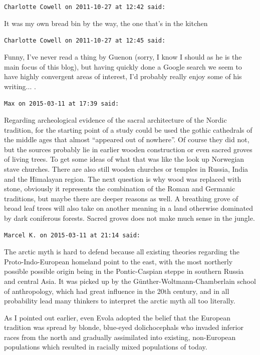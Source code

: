 \begin{footnotesize}
\begin{sffamily}
\hfill

\texttt{Charlotte Cowell on 2011-10-27 at 12:42 said:}

It was my own bread bin by the way, the one that's in the kitchen

\hfill

\texttt{Charlotte Cowell on 2011-10-27 at 12:45 said:}

Funny, I've never read a thing by Guenon (sorry, I know I should as he is the main focus of this blog), but having quickly done a Google search we seem to have highly convergent areas of interest, I'd probably really enjoy some of his writing... .

\hfill

\texttt{Max on 2015-03-11 at 17:39 said:}

Regarding archeological evidence of the sacral architecture of the Nordic tradition, for the starting point of a study could be used the gothic cathedrals of the middle ages that almost ``appeared out of nowhere''. Of course they did not, but the sources probably lie in earlier wooden construction or even sacred groves of living trees. To get some ideas of what that was like the look up Norwegian stave churches. There are also still wooden churches or temples in Russia, India and the Himalayan region. The next question is why wood was replaced with stone, obviously it represents the combination of the Roman and Germanic traditions, but maybe there are deeper reasons as well. A breathing grove of broad leaf trees will also take on another meaning in a land otherwise dominated by dark coniferous forests. Sacred groves does not make much sense in the jungle.

\hfill

\texttt{Marcel K. on 2015-03-11 at 21:14 said:}

The arctic myth is hard to defend because all existing theories regarding the Proto-Indo-European homeland point to the east, with the most northerly possible possible origin being in the Pontic-Caspian steppe in southern Russia and central Asia. It was picked up by the Günther-Woltmann-Chamberlain school of anthropology, which had great influence in the 20th century, and in all probability lead many thinkers to interpret the arctic myth all too literally.

As I pointed out earlier, even Evola adopted the belief that the European tradition was spread by blonde, blue-eyed dolichocephals who invaded inferior races from the north and gradually assimilated into existing, non-European populations which resulted in racially mixed populations of today.


\end{sffamily}
\end{footnotesize}
